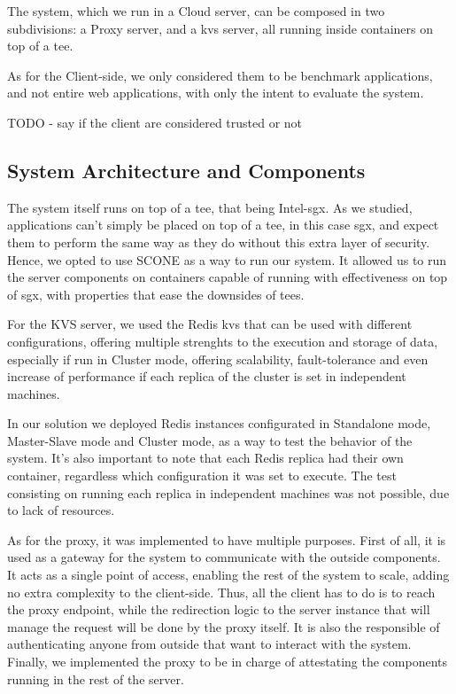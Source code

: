 The system, which we run in a Cloud server, can be composed in two subdivisions: a Proxy server, and a \gls{kvs} server, all running inside containers on top of a \gls{tee}. 

As for the Client-side, we only considered them to be benchmark applications, and not entire web applications, with only the intent to evaluate the system.

TODO - say if the client are considered trusted or not


\subsection{System Architecture and Components}

The system itself runs on top of a \gls{tee}, that being Intel-\gls{sgx}. As we studied, applications can't simply be placed on top of a \gls{tee}, in this case \gls{sgx}, and expect them to perform the same way as they do without this extra layer of security. 
Hence, we opted to use SCONE \cite{ssec:scone} as a way to run our system. It allowed us to run the server components on containers capable of running with effectiveness on top of \gls{sgx}, with properties that ease the downsides of \gls{tee}s. 

For the KVS server, we used the Redis \gls{kvs} that can be used with different configurations, offering multiple strenghts to the execution and storage of data, especially if run in Cluster mode, offering scalability, fault-tolerance and even increase of performance if each replica of the cluster is set in independent machines.
 
In our solution we deployed Redis instances configurated in Standalone mode, Master-Slave mode and Cluster mode, as a way to test the behavior of the system. It's also important to note that each Redis replica had their own container, regardless which configuration it was set to execute. The test consisting on running each replica in independent machines was not possible, due to lack of resources.   

As for the proxy, it was implemented to have multiple purposes. First of all, it is used as a gateway for the system to communicate with the outside components.  It acts as a single point of access, enabling the rest of the system to scale, adding no extra complexity to the client-side. Thus, all the client has to do is to reach the proxy endpoint, while the redirection logic to the server instance that will manage the request will be done by the proxy itself. It is also the responsible of authenticating anyone from outside that want to interact with the system. Finally, we implemented the proxy to be in charge of attestating the components running in the rest of the server. 

